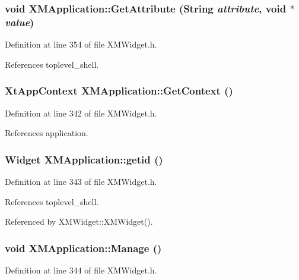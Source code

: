 \subsubsection{\setlength{\rightskip}{0pt plus 5cm}void XMApplication::Get\-Attribute (String {\em attribute}, void $\ast$ {\em value})\hspace{0.3cm}{\tt  [inline]}}\label{classXMApplication_a10}




Definition at line 354 of file XMWidget.h.

References toplevel\_\-shell.
\subsubsection{\setlength{\rightskip}{0pt plus 5cm}Xt\-App\-Context XMApplication::Get\-Context ()\hspace{0.3cm}{\tt  [inline]}}\label{classXMApplication_a2}




Definition at line 342 of file XMWidget.h.

References application.
\subsubsection{\setlength{\rightskip}{0pt plus 5cm}Widget XMApplication::getid ()\hspace{0.3cm}{\tt  [inline]}}\label{classXMApplication_a3}




Definition at line 343 of file XMWidget.h.

References toplevel\_\-shell.

Referenced by XMWidget::XMWidget().
\subsubsection{\setlength{\rightskip}{0pt plus 5cm}void XMApplication::Manage ()\hspace{0.3cm}{\tt  [inline]}}\label{classXMApplication_a4}




Definition at line 344 of file XMWidget.h.

